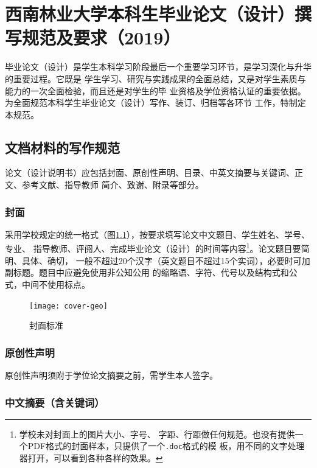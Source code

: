 \documentclass{swfuthesis}
\begin{document}
\singlespacing

\chapter{西南林业大学本科生毕业论文（设计）撰写规范及要求（2019）}
\label{cha:std}

毕业论文（设计）是学生本科学习阶段最后一个重要学习环节，是学习深化与升华的重要过程。它既是
学生学习、研究与实践成果的全面总结，又是对学生素质与能力的一次全面检验，而且还是对学生的毕
业资格及学位资格认证的重要依据。为全面规范本科学生毕业论文（设计）写作、装订、归档等各环节
工作，特制定本规范。

\section{文档材料的写作规范}

论文（设计说明书）应包括封面、原创性声明、目录、中英文摘要与关键词、正文、参考文献、指导教师
简介、致谢、附录等部分。

\subsection{封面}

采用学校规定的统一格式（图\ref{fig:cover}），按要求填写论文中文题目、学生姓名、学号、专业、
指导教师、评阅人、完成毕业论文（设计）的时间等内容{\wrong}\footnote{学校未对封面上的图片大小、字号、
  字距、行距做任何规范。也没有提供一个PDF格式的封面样本，只提供了一个\texttt{.doc}格式的模
  板，用不同的文字处理器打开，可以看到各种各样的效果。}。论文题目要简明、具体、确切，
一般不超过20个汉字（英文题目不超过15个实词），必要时可加副标题。题目中应避免使用非公知公用
的缩略语、字符、代号以及结构式和公式，中间不使用标点。

\begin{figure}
  \centering
  \texttt{[image: cover-geo]}
  \caption{封面标准\label{fig:cover}}  
\end{figure}

\subsection{原创性声明}

原创性声明须附于学位论文摘要之前，需学生本人签字。

\subsection{中文摘要（含关键词）}
\end{document}
